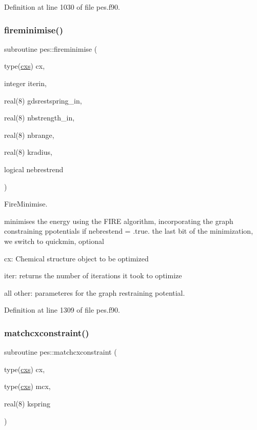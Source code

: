 Definition at line 1030 of file pes.\+f90.

\mbox{\label{namespacepes_ad09cee72e0fef4317231efc6b7cf35fd}} 
\subsubsection{\texorpdfstring{fireminimise()}{fireminimise()}}
{\footnotesize\ttfamily subroutine pes\+::fireminimise (\begin{DoxyParamCaption}\item[{type(\mbox{\hyperlink{structchemstr_1_1cxs}{cxs}})}]{cx,  }\item[{integer}]{iterin,  }\item[{real(8)}]{gdsrestspring\+\_\+in,  }\item[{real(8)}]{nbstrength\+\_\+in,  }\item[{real(8)}]{nbrange,  }\item[{real(8)}]{kradius,  }\item[{logical}]{nebrestrend }\end{DoxyParamCaption})}



Fire\+Minimise. 

minimises the energy using the F\+I\+RE algorithm, incorporating the graph constraining ppotentials if nebrestend = .true. the last bit of the minimization, we switch to quickmin, optional


\begin{DoxyItemize}
\item cx\+: Chemical structure object to be optimized
\item iter\+: returns the number of iterations it took to optimize
\item all other\+: parameteres for the graph restraining potential. 
\end{DoxyItemize}

Definition at line 1309 of file pes.\+f90.

\mbox{\label{namespacepes_aacd7a0dc07c19006c3f5e8cfaede7313}} 
\subsubsection{\texorpdfstring{matchcxconstraint()}{matchcxconstraint()}}
{\footnotesize\ttfamily subroutine pes\+::matchcxconstraint (\begin{DoxyParamCaption}\item[{type(\mbox{\hyperlink{structchemstr_1_1cxs}{cxs}})}]{cx,  }\item[{type(\mbox{\hyperlink{structchemstr_1_1cxs}{cxs}})}]{mcx,  }\item[{real(8)}]{kspring }\end{DoxyParamCaption})}



